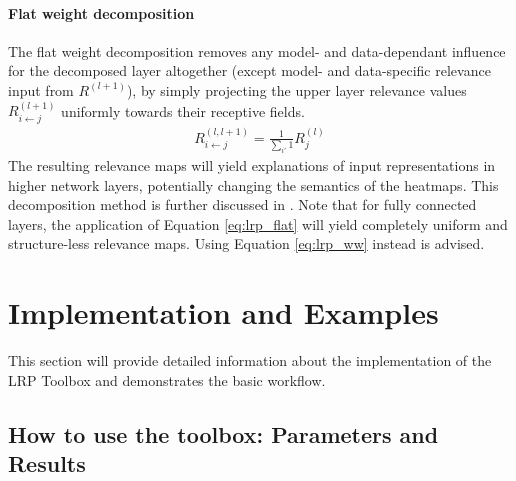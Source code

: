 \documentclass[a4wide]{article}
\begin{document}
\paragraph{Flat weight decomposition}
The flat weight decomposition removes any model- and data-dependant influence for the decomposed layer altogether (except model- and data-specific relevance input from $R^{(l+1)}$), by simply projecting the upper layer relevance values $R^{(l+1)}_{i\leftarrow j}$ uniformly towards their receptive fields.
\begin{align}
R^{(l,l+1)}_{i\leftarrow j} = \frac{1}{\sum\limits_{i'} 1}R^{(l)}_{j}
\label{eq:lrp_flat}
\end{align}
The resulting relevance maps will yield explanations of input representations in higher network layers, potentially changing the semantics of the heatmaps. This decomposition method is further discussed in \cite{BacICIP16}. Note that for fully connected layers, the application of Equation \ref{eq:lrp_flat} will yield completely uniform and structure-less relevance maps. Using Equation \ref{eq:lrp_ww} instead is advised.




\section{Implementation and Examples}
\label{sec:implementation}
This section will provide detailed information about the implementation of the LRP Toolbox and demonstrates the basic workflow.

\subsection*{How to use the toolbox: Parameters and Results}
\end{document}
